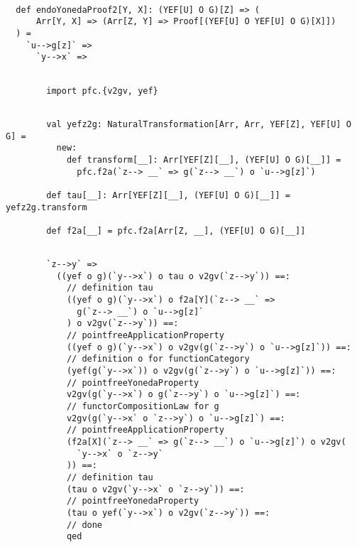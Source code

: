 \documentclass[11pt]{article}
\def\edefn{\endgroup\par\pagebreak[2]\addvspace{\medskipamount}}
\let\ecode=\edefn
\begin{document}
\vspace{6pt}
\begin{mdframed}[backgroundcolor=lightgray!20] 
\begin{lstlisting}

  def endoYonedaProof2[Y, X]: (YEF[U] O G)[Z] => (
      Arr[Y, X] => (Arr[Z, Y] => Proof[(YEF[U] O YEF[U] O G)[X]])
  ) =
    `u-->g[z]` =>
      `y-->x` =>
\end{lstlisting}
\end{mdframed}
\vspace{6pt}
\begin{mdframed}[backgroundcolor=lightgray!20] 
\begin{lstlisting}

        import pfc.{v2gv, yef}
\end{lstlisting}
\end{mdframed}
\vspace{6pt}
\begin{mdframed}[backgroundcolor=lightgray!20] 
\begin{lstlisting}

        val yefz2g: NaturalTransformation[Arr, Arr, YEF[Z], YEF[U] O G] =
          new:
            def transform[__]: Arr[YEF[Z][__], (YEF[U] O G)[__]] =
              pfc.f2a(`z--> __` => g(`z--> __`) o `u-->g[z]`)

        def tau[__]: Arr[YEF[Z][__], (YEF[U] O G)[__]] = yefz2g.transform

        def f2a[__] = pfc.f2a[Arr[Z, __], (YEF[U] O G)[__]]
\end{lstlisting}
\end{mdframed}
\vspace{6pt}
\begin{mdframed}[backgroundcolor=lightgray!20] 
\begin{lstlisting}

        `z-->y` =>
          ((yef o g)(`y-->x`) o tau o v2gv(`z-->y`)) ==:
            // definition tau
            ((yef o g)(`y-->x`) o f2a[Y](`z--> __` =>
              g(`z--> __`) o `u-->g[z]`
            ) o v2gv(`z-->y`)) ==:
            // pointfreeApplicationProperty
            ((yef o g)(`y-->x`) o v2gv(g(`z-->y`) o `u-->g[z]`)) ==:
            // definition o for functionCategory
            (yef(g(`y-->x`)) o v2gv(g(`z-->y`) o `u-->g[z]`)) ==:
            // pointfreeYonedaProperty
            v2gv(g(`y-->x`) o g(`z-->y`) o `u-->g[z]`) ==:
            // functorCompositionLaw for g
            v2gv(g(`y-->x` o `z-->y`) o `u-->g[z]`) ==:
            // pointfreeApplicationProperty
            (f2a[X](`z--> __` => g(`z--> __`) o `u-->g[z]`) o v2gv(
              `y-->x` o `z-->y`
            )) ==:
            // definition tau
            (tau o v2gv(`y-->x` o `z-->y`)) ==:              
            // pointfreeYonedaProperty
            (tau o yef(`y-->x`) o v2gv(`z-->y`)) ==:
            // done
            qed 
\end{lstlisting}
\end{mdframed}    
\ecode
\end{document}

